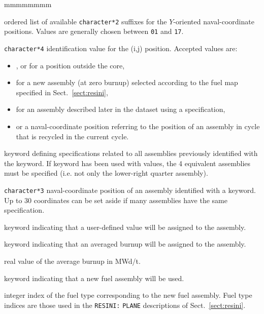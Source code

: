 \begin{ListeDeDescription}{mmmmmmmm}
\item[\dusa{hy}] ordered list of available \texttt{character*2} suffixes for the $Y$-oriented
naval-coordinate positions. Values are generally chosen between {\tt 01} and {\tt 17}.

\item[\dusa{hcase}] \texttt{character*4} identification value for the (i,j) position. Accepted
values are:
\begin{itemize}
\item \moc{|}, \moc{-} or \moc{-|-} for a position outside the core,
\item {} for a new assembly (at zero burnup) selected according to the fuel map specified in Sect.~\ref{sect:resini},
\item {} for an assembly described later in the dataset using a  specification,
\item or a naval-coordinate position referring to the position of an assembly in cycle  that is
recycled in the current cycle.
\end{itemize}

\item[\moc{SPEC}] keyword defining specifications related to all assemblies previously identified with
the  keyword. If  keyword has been used with  values, the 4 equivalent
assemblies must be specified (i.e. not only the lower-right quarter assembly).

\item[\dusa{asmb1}] \texttt{character*3} naval-coordinate position of an assembly identified with a  keyword. Up to 30 coordinates can be set aside
if many assemblies have the same specification.

\item[\moc{SET}] keyword indicating that a user-defined value will be assigned to the assembly.

\item[\moc{AVGB}] keyword indicating that an averaged burnup will be assigned to the assembly.

\item[\dusa{avburn}] real value of the average burnup in MWd/t.

\item[\moc{FUEL}] keyword indicating that a new fuel assembly will be used.

\item[\dusa{fuel}] integer index of the fuel type corresponding to the new fuel assembly. Fuel type indices are those used in the
{\tt RESINI:} {\tt PLANE} descriptions of Sect.~\ref{sect:resini}.


\end{ListeDeDescription}
